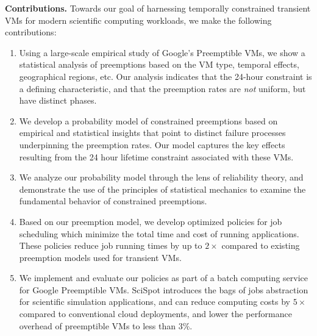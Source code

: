 \noindent \textbf{Contributions.}
%
Towards our goal of harnessing temporally constrained transient VMs for modern scientific computing workloads, 
we make the following contributions:
\begin{enumerate} [leftmargin=12pt]
\item Using a large-scale empirical study of Google's Preemptible VMs, we show a statistical analysis of preemptions based on the VM type, temporal effects, geographical regions, etc. Our analysis indicates that the 24-hour constraint is a defining characteristic, and that the preemption rates are \emph{not} uniform, but have distinct phases. 

\item We develop a probability model of constrained preemptions based on empirical and statistical insights that point to distinct failure processes underpinning the preemption rates. Our model captures the key effects resulting from the 24 hour lifetime constraint associated with these VMs.

\item We analyze our probability model through the lens of reliability theory, and demonstrate the use of the principles of statistical mechanics to examine the fundamental behavior of constrained preemptions. 
  


\item Based on our preemption model, we develop optimized policies for job scheduling which minimize the total time and cost of running applications. These policies reduce job running times by up to $2\times$ compared to existing preemption models used for transient VMs. 
  

\item We implement and evaluate our policies as part of a batch computing service for Google Preemptible VMs. SciSpot introduces the bags of jobs abstraction for scientific simulation applications, and can reduce computing costs by $5\times$ compared to conventional cloud deployments, and lower the performance overhead of preemptible VMs to less than $3\%$. 


\end{enumerate}
